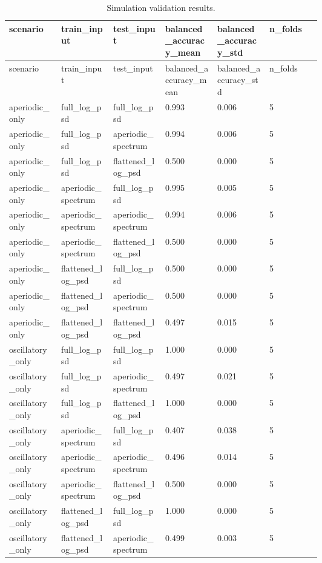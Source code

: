 \begin{longtable}{p{0.10\linewidth}p{0.10\linewidth}p{0.10\linewidth}p{0.10\linewidth}p{0.10\linewidth}p{0.10\linewidth}}
\caption{Simulation validation results.}\label{tab:supp_simulation_validation}\\
\toprule
scenario & train\_input & test\_input & balanced\_accuracy\_mean & balanced\_accuracy\_std & n\_folds\\
\midrule
\endfirsthead
\toprule
scenario & train\_input & test\_input & balanced\_accuracy\_mean & balanced\_accuracy\_std & n\_folds\\
\midrule
\endhead
aperiodic\_only & full\_log\_psd & full\_log\_psd & 0.993 & 0.006 & 5\\
aperiodic\_only & full\_log\_psd & aperiodic\_spectrum & 0.994 & 0.006 & 5\\
aperiodic\_only & full\_log\_psd & flattened\_log\_psd & 0.500 & 0.000 & 5\\
aperiodic\_only & aperiodic\_spectrum & full\_log\_psd & 0.995 & 0.005 & 5\\
aperiodic\_only & aperiodic\_spectrum & aperiodic\_spectrum & 0.994 & 0.006 & 5\\
aperiodic\_only & aperiodic\_spectrum & flattened\_log\_psd & 0.500 & 0.000 & 5\\
aperiodic\_only & flattened\_log\_psd & full\_log\_psd & 0.500 & 0.000 & 5\\
aperiodic\_only & flattened\_log\_psd & aperiodic\_spectrum & 0.500 & 0.000 & 5\\
aperiodic\_only & flattened\_log\_psd & flattened\_log\_psd & 0.497 & 0.015 & 5\\
oscillatory\_only & full\_log\_psd & full\_log\_psd & 1.000 & 0.000 & 5\\
oscillatory\_only & full\_log\_psd & aperiodic\_spectrum & 0.497 & 0.021 & 5\\
oscillatory\_only & full\_log\_psd & flattened\_log\_psd & 1.000 & 0.000 & 5\\
oscillatory\_only & aperiodic\_spectrum & full\_log\_psd & 0.407 & 0.038 & 5\\
oscillatory\_only & aperiodic\_spectrum & aperiodic\_spectrum & 0.496 & 0.014 & 5\\
oscillatory\_only & aperiodic\_spectrum & flattened\_log\_psd & 0.500 & 0.000 & 5\\
oscillatory\_only & flattened\_log\_psd & full\_log\_psd & 1.000 & 0.000 & 5\\
oscillatory\_only & flattened\_log\_psd & aperiodic\_spectrum & 0.499 & 0.003 & 5\\

\end{longtable}
